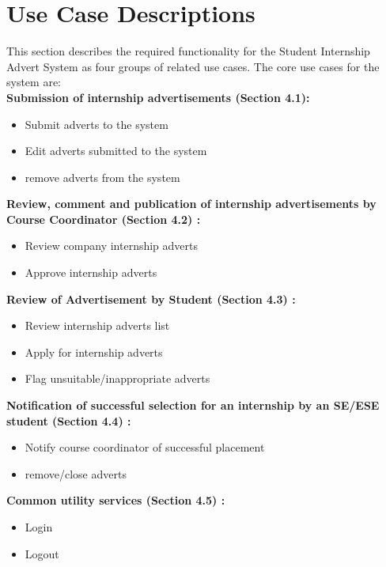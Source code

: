 \documentclass{l3deliverable}
\begin{document}
\section{Use Case Descriptions}
This section describes the required functionality for the Student Internship Advert System as
four groups of related
use cases. The core use cases for the system are:\\
\textbf{Submission of internship advertisements (Section 4.1):}
\begin{itemize}
\item Submit adverts to the system
\item Edit adverts submitted to the system
\item remove adverts from the system
\end{itemize}
\textbf{Review, comment and publication of internship advertisements by Course Coordinator
(Section 4.2) :}
\begin{itemize}
\item Review company internship adverts
\item Approve internship adverts
\end{itemize}
\textbf{Review of Advertisement by Student (Section 4.3) :}
\begin{itemize}
\item Review internship adverts list
\item Apply for internship adverts
\item Flag unsuitable/inappropriate adverts
\end{itemize}
\textbf{Notification of successful selection for an internship by an SE/ESE student (Section 4.4)
:}
\begin{itemize}
\item Notify course coordinator of successful placement
\item remove/close adverts
\end{itemize}
\textbf{Common utility services (Section 4.5) :}
\begin{itemize}
\item Login
\item Logout
\end{itemize}
\end{document}
